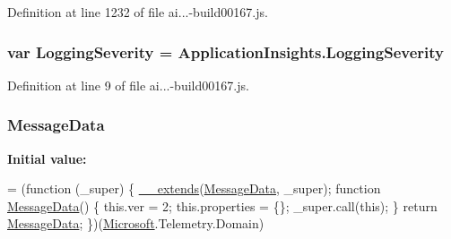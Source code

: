 Definition at line 1232 of file ai...-\/build00167.\+js.

\subsubsection[{\texorpdfstring{Logging\+Severity}{LoggingSeverity}}]{\setlength{\rightskip}{0pt plus 5cm}var Logging\+Severity = Application\+Insights.\+Logging\+Severity}\hypertarget{_scripts_2ai_80_822_89-build00167_8js_a7c9dc87e469261dd3cdf56090107bebc}{}\label{_scripts_2ai_80_822_89-build00167_8js_a7c9dc87e469261dd3cdf56090107bebc}


Definition at line 9 of file ai...-\/build00167.\+js.

\subsubsection[{\texorpdfstring{Message\+Data}{MessageData}}]{ Message\+Data}\hypertarget{_scripts_2ai_80_822_89-build00167_8js_af4121513f8b983994459ac94f198e89c}{}\label{_scripts_2ai_80_822_89-build00167_8js_af4121513f8b983994459ac94f198e89c}
{\bfseries Initial value\+:}
\begin{DoxyCode}
= (\textcolor{keyword}{function} (\_super) \{
        \hyperlink{obj_2_release_2_package_2_package_tmp_2_scripts_2ai_80_822_89-build00167_8js_ac09f4951ac4b25df0272d4e78ff85ae0}{\_\_extends}(\hyperlink{obj_2_release_2_package_2_package_tmp_2_scripts_2ai_80_822_89-build00167_8js_af4121513f8b983994459ac94f198e89c}{MessageData}, \_super);
        \textcolor{keyword}{function} \hyperlink{obj_2_release_2_package_2_package_tmp_2_scripts_2ai_80_822_89-build00167_8js_af4121513f8b983994459ac94f198e89c}{MessageData}() \{
            this.ver = 2;
            this.properties = \{\};
            \_super.call(\textcolor{keyword}{this});
        \}
        \textcolor{keywordflow}{return} \hyperlink{obj_2_release_2_package_2_package_tmp_2_scripts_2ai_80_822_89-build00167_8js_af4121513f8b983994459ac94f198e89c}{MessageData};
    \})(\hyperlink{obj_2_release_2_package_2_package_tmp_2_scripts_2ai_80_822_89-build00167_8js_af7b21097393c8dc2ece8949358ff0e27}{Microsoft}.Telemetry.Domain)
\end{DoxyCode}


